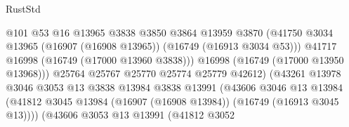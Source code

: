 \begin{lexlean}{RustStd}
\begin{coremodule}
                                              @101
                                              @53
                                              @16
                                              @13965
                                              @3838
                                              @3850
                                              @3864
                                              @13959
                                              @3870
                                              (@41750
                                                @3034
                                                @13965
                                                (@16907 (@16908 @13965))
                                                (@16749 (@16913 @3034 @53)))
                                              @41717
                                              @16998
                                              (@16749 (@17000 @13960 @3838)))
                                            @16998
                                            (@16749 (@17000 @13950 @13968)))
                                          @25764
                                          @25767
                                          @25770
                                          @25774
                                          @25779
                                          @42612)
                                        (@43261
                                          @13978
                                          @3046
                                          @3053
                                          @13
                                          @3838
                                          @13984
                                          @3838
                                          @13991
                                          (@43606
                                            @3046
                                            @13
                                            @13984
                                            (@41812
                                              @3045
                                              @13984
                                              (@16907 (@16908 @13984))
                                              (@16749 (@16913 @3045 @13))))
                                          (@43606
                                            @3053
                                            @13
                                            @13991
                                            (@41812
                                              @3052

\end{coremodule}
\end{lexlean}
